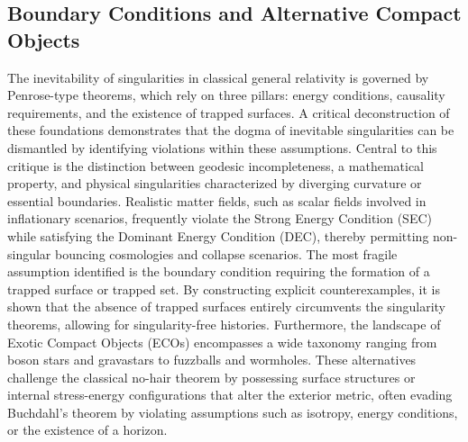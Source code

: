 \documentclass[conference]{IEEEtran}
\begin{document}
\subsection{Boundary Conditions and Alternative Compact Objects}
The inevitability of singularities in classical general relativity is governed by Penrose-type theorems, which rely on three pillars: energy conditions, causality requirements, and the existence of trapped surfaces. A critical deconstruction of these foundations demonstrates that the dogma of inevitable singularities can be dismantled by identifying violations within these assumptions. Central to this critique is the distinction between geodesic incompleteness, a mathematical property, and physical singularities characterized by diverging curvature or essential boundaries. Realistic matter fields, such as scalar fields involved in inflationary scenarios, frequently violate the Strong Energy Condition (SEC) while satisfying the Dominant Energy Condition (DEC), thereby permitting non-singular bouncing cosmologies and collapse scenarios. The most fragile assumption identified is the boundary condition requiring the formation of a trapped surface or trapped set. By constructing explicit counterexamples, it is shown that the absence of trapped surfaces entirely circumvents the singularity theorems, allowing for singularity-free histories. Furthermore, the landscape of Exotic Compact Objects (ECOs) encompasses a wide taxonomy ranging from boson stars and gravastars to fuzzballs and wormholes. These alternatives challenge the classical no-hair theorem by possessing surface structures or internal stress-energy configurations that alter the exterior metric, often evading Buchdahl's theorem by violating assumptions such as isotropy, energy conditions, or the existence of a horizon.
\end{document}
